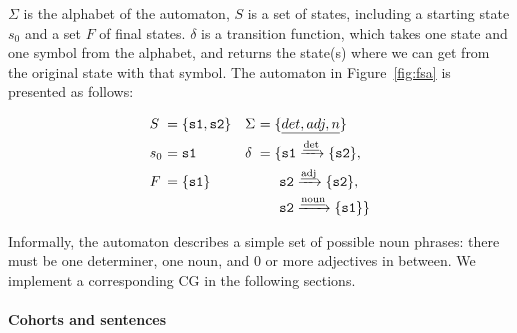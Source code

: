 \noindent $\Sigma$ is the alphabet of the automaton, $S$ is a set of states,
including a starting state $s_0$ and a set $F$ of final states.
$\delta$ is a transition function, which takes one state and one
symbol from the alphabet, and returns the state(s) where we can get
from the original state with that symbol.
The automaton in Figure~\ref{fig:fsa} is presented as follows:

\[\!
\begin{aligned}
  &S&      \!\!\!\!=\;& \{\t{s1}, \t{s2}\}  &&\Sigma& \!\!\!\!=\;& \{\emph{det, adj, n}\} \\
  &s_0&    \!\!\!\!=\;& \t{s1}              &&\delta& \!\!\!\!=\;& \{\t{s1} \xrightarrow{\text{\em det}} \{\t{s2}\},  \\ 
  &F&      \!\!\!\!=\;& \{\t{s1}\}          &&      & \!\!\!\! \;& \ \t{s2} \xrightarrow{\text{\em adj}} \{\t{s2}\}, \\
  & &                 &                     &&      & \!\!\!\! \;& \ \t{s2} \xrightarrow{\text{\em noun}} \{\t{s1}\} \} \\
\end{aligned}
\]

Informally, the automaton describes a simple set of possible noun
phrases: there must be one determiner, one noun, and 0 or more
adjectives in between. 
We implement a corresponding CG in the following sections.


\paragraph{Cohorts and sentences}

